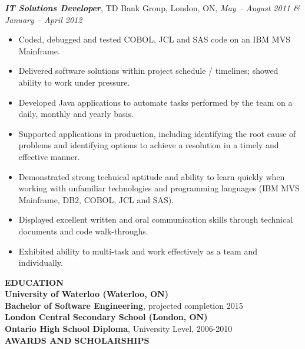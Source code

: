 \documentclass[10pt,letterpaper]{article}
\newcommand{\job}[4]
{
    \emph{\textbf{#1}}, #2, #3, \emph{#4}
}
\newcommand{\education}[4]
{
    \textbf{#1 (#2)}\\
    \textbf{#3}, #4
}
\begin{document}
\vspace{0.5em}
\job{IT Solutions Developer}{TD Bank Group}{London, ON}{May -- August 2011 \& January -- April 2012}\\
\begin{adjustwidth}{0.1in}{0.5in}
    \begin{itemize}
	\item Coded, debugged and tested COBOL, JCL and SAS code on an IBM MVS Mainframe.
	\item Delivered software solutions within project schedule / timelines; showed ability to work under pressure.
	\item Developed Java applications to automate tasks performed by the team on a daily, monthly and yearly basis.
	\item Supported applications in production, including identifying the root cause of problems and identifying 
	    options to achieve a resolution in a timely and effective manner.
	\item Demonstrated strong technical aptitude and ability to learn quickly when working with unfamiliar 
	    technologies and programming languages (IBM MVS Mainframe, DB2, COBOL, JCL and SAS).
	\item Displayed excellent written and oral communication skills through technical documents and code 
	    walk-throughs.
	\item Exhibited ability to multi-task and work effectively as a team and individually.
    \end{itemize}
\end{adjustwidth}
\vspace{1em}
\textbf{EDUCATION} \hrulefill \\[0.5em]
\education{University of Waterloo}{Waterloo, ON}{Bachelor of Software Engineering}{projected completion 2015}\\[1em]
\education{London Central Secondary School}{London, ON}{Ontario High School Diploma}{University Level, 2006-2010}\\[1em]
\textbf{AWARDS AND SCHOLARSHIPS} \hrulefill \\
\end{document}
